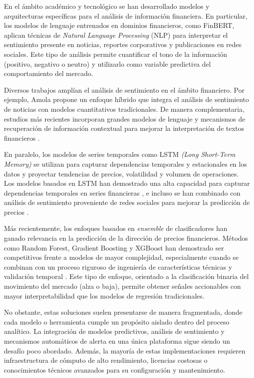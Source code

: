   En el ámbito académico y tecnológico se han desarrollado modelos y arquitecturas
  específicas para el análisis de información financiera. En particular, los modelos
  de lenguaje entrenados en dominios financieros, como FinBERT, aplican técnicas de
  \textit{Natural Language Processing} (NLP) para interpretar el sentimiento presente
  en noticias, reportes corporativos y publicaciones en redes sociales. Este tipo de
  análisis permite cuantificar el tono de la información (positivo, negativo o neutro)        
  y utilizarlo como variable predictiva del comportamiento del mercado.

  Diversos trabajos amplían el análisis de sentimiento en el ámbito financiero. Por
  ejemplo, Amola \parencite{amola2025sentiment} propone un enfoque híbrido que
  integra el análisis de sentimiento de noticias con modelos cuantitativos
  tradicionales. De manera complementaria, estudios más recientes incorporan grandes
  modelos de lenguaje y mecanismos de recuperación de información contextual para
  mejorar la interpretación de textos financieros
  \parencite{llm2023financialsentiment}.

  En paralelo, los modelos de series temporales como LSTM
  \textit{(Long Short-Term Memory)} se utilizan para capturar dependencias temporales
  y estacionales en los datos y proyectar tendencias de precios, volatilidad y volumen        
  de operaciones. Los modelos basados en LSTM han demostrado una alta capacidad para
  capturar dependencias temporales en series financieras
  \parencite{lstm2022financial,comparison2019arima}, e incluso se han combinado con
  análisis de sentimiento proveniente de redes sociales para mejorar la predicción de
  precios \parencite{twitter2024lstm}.

  Más recientemente, los enfoques basados en \textit{ensemble} de clasificadores han
  ganado relevancia en la predicción de la dirección de precios financieros. Métodos
  como Random Forest, Gradient Boosting y XGBoost han demostrado ser competitivos
  frente a modelos de mayor complejidad, especialmente cuando se combinan con un
  proceso riguroso de ingeniería de características técnicas y validación temporal
  \parencite{comparison2019arima}. Este tipo de enfoque, orientado a la clasificación
  binaria del movimiento del mercado (alza o baja), permite obtener señales accionables       
  con mayor interpretabilidad que los modelos de regresión tradicionales.

  No obstante, estas soluciones suelen presentarse de manera fragmentada, donde cada
  modelo o herramienta cumple un propósito aislado dentro del proceso analítico. La
  integración de modelos predictivos, análisis de sentimiento y mecanismos automáticos        
  de alerta en una única plataforma sigue siendo un desafío poco abordado. Además,
  la mayoría de estas implementaciones requieren infraestructura de cómputo de alto
  rendimiento, licencias costosas o conocimientos técnicos avanzados para su
  configuración y mantenimiento.

